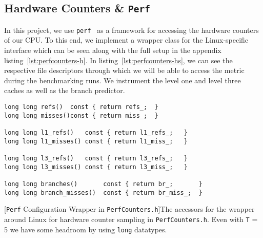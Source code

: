 \documentclass{article}
\begin{document}
\subsection{Hardware Counters \& \texttt{Perf}}
In this project, we use \texttt{perf}~\cite{perfwiki2025} as a framework for accessing the hardware counters of our CPU. To this end, we implement a wrapper class for the Linux-specific interface which can be seen along with the full setup in the appendix listing~\ref{lst:perfcounters-h}. In listing~\ref{lst:perfcounters-hs}, we can see the respective file descriptors through which we will be able to access the metric during the benchmarking runs. We instrument the level one and level three caches as well as the branch predictor. 
\label{sec:counters}
\begin{lstlisting}
long long refs()  const { return refs_;  }
long long misses()const { return miss_;  }

long long l1_refs()   const { return l1_refs_;   }
long long l1_misses() const { return l1_miss_;   }

long long l3_refs()   const { return l3_refs_;   }
long long l3_misses() const { return l3_miss_;   }

long long branches()       const { return br_;       }
long long branch_misses()  const { return br_miss_;  }
\end{lstlisting}
[\texttt{Perf} Configuration Wrapper in \texttt{PerfCounters.h}]{The accessors for the wrapper around Linux for hardware counter sampling in \texttt{PerfCounters.h}. Even with \texttt{T} = 5 we have some headroom by using \texttt{long} datatypes.}
\label{lst:perfcounters-hs}
\end{document}
